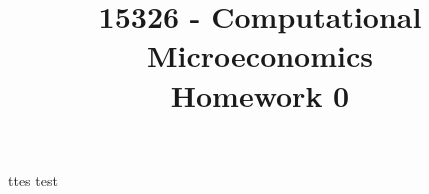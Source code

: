 \documentclass{article}
\title{15326 - Computational Microeconomics\\
Homework 0}
\begin{document}
ttes test
\end{document}
